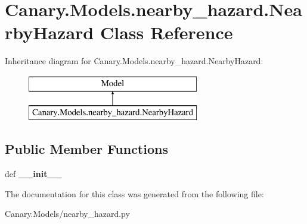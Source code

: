 \hypertarget{class_canary_8_models_1_1nearby__hazard_1_1_nearby_hazard}{\section{Canary.\-Models.\-nearby\-\_\-hazard.\-Nearby\-Hazard Class Reference}
\label{class_canary_8_models_1_1nearby__hazard_1_1_nearby_hazard}
}
Inheritance diagram for Canary.\-Models.\-nearby\-\_\-hazard.\-Nearby\-Hazard\-:\begin{figure}[H]
\begin{center}
\leavevmode
\includegraphics[height=2.000000cm]{class_canary_8_models_1_1nearby__hazard_1_1_nearby_hazard}
\end{center}
\end{figure}
\subsection*{Public Member Functions}
\begin{DoxyCompactItemize}
\item 
\hypertarget{class_canary_8_models_1_1nearby__hazard_1_1_nearby_hazard_a49acce2a3cbb741fc007e465ad126bcf}{def {\bfseries \-\_\-\-\_\-init\-\_\-\-\_\-}}\label{class_canary_8_models_1_1nearby__hazard_1_1_nearby_hazard_a49acce2a3cbb741fc007e465ad126bcf}

\end{DoxyCompactItemize}


The documentation for this class was generated from the following file\-:\begin{DoxyCompactItemize}
\item 
Canary.\-Models/nearby\-\_\-hazard.\-py\end{DoxyCompactItemize}
